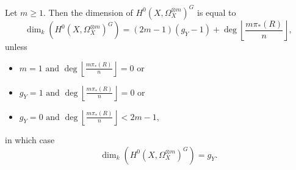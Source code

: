     \begin{prop}\label{dim}
    Let $m\geq 1$. Then the dimension of $H^0(X,\Omega_X^{\otimes m})^G$ is equal to
        \[
        \dim_k \left( H^0(X,\Omega_X^{\otimes m})^G \right) = (2m-1)(g_Y-1) + \deg\left\lfloor\frac{m\pi_*(R)}{n} \right\rfloor,
        \]  
    unless 
        \begin{itemize}
        \item $m=1 \mbox{ and } \deg\left\lfloor\frac{m\pi_*(R)}{n}\right\rfloor = 0$ or
        \item $g_Y=1 \mbox{ and } \deg\left\lfloor\frac{m\pi_*(R)}{n}\right\rfloor = 0$ or
        \item  $g_Y=0 \mbox{ and } \deg\left\lfloor\frac{m\pi_*(R)}{n}\right\rfloor < 2m-1$,
        \end{itemize}
    in which case 
        \[
        \dim_k \left( H^0(X,\Omega_X^{\otimes m})^G \right) = g_Y.
        \]      
    \end{prop}
